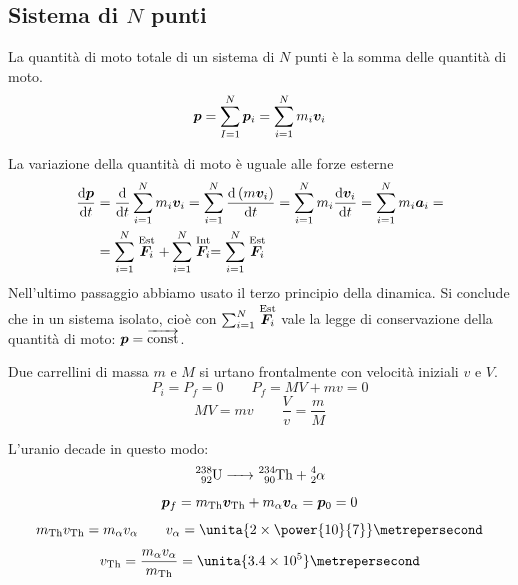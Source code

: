 \subsection{Sistema di $N$ punti}
\begin{Def}
La quantità di moto totale di un sistema di $N$ punti è la somma delle quantità di moto.
\begin{equation}
 \boldsymbol{p}=\sum_{I=1}^N\boldsymbol{p}_i=\sum_{i=1}^Nm_i\boldsymbol{v}_i
\end{equation}
\end{Def}
\begin{Teo}
 La variazione della quantità di moto è uguale alle forze esterne
\begin{align*}\frac{\mathrm{d} \boldsymbol{p}}{\mathrm{d} t}&=\frac{\mathrm{d} }{\mathrm{d} t}\sum^N_{i=1}m_i\boldsymbol{v}_i=\sum_{i=1}^{N}\frac{\mathrm{d} \left(m\boldsymbol{v}_i\right)}{\mathrm{d} t}=\sum_{i=1}^{N}m_i\frac{\mathrm{d} \boldsymbol{v}_i}{\mathrm{d} t}=\sum_{i=1}^{N}m_i\boldsymbol{a}_i=\\
&=\sum^N_{i=1}\stackrel{\text{Est}}{\boldsymbol{F}_i}+\sum^N_{i=1}\stackrel{\text{Int}}{\boldsymbol{F}_i}=\sum^N_{i=1}\stackrel{\text{Est}}{\boldsymbol{F}_i}\end{align*}
Nell'ultimo passaggio abbiamo usato il terzo principio della dinamica. Si conclude che in un sistema isolato, cioè con
$\sum^N_{i=1}\stackrel{\text{Est}}{\boldsymbol{F}_i}$ vale la legge di
conservazione della quantità di moto: $\boldsymbol{p}=\overrightarrow{\text{const}}$.
\end{Teo}
\begin{Es}[carrellini]
Due carrellini di massa $m$ e $M$ si urtano frontalmente con
velocità iniziali $v$ e $V$.
\begin{equation*} P_i= P_f=0\qquad P_f=M V+m v=0\end{equation*}
\begin{equation*}M V=m v\qquad\frac{V}{v}=\frac{m}{M}\end{equation*}
\end{Es}

\begin{Es}[decadimento]
L'uranio decade in questo modo:
\begin{equation*}\ce{^{238}_{92}U -> ^{234}_{90}Th + ^{4}_{2}\alpha}\end{equation*}
\begin{equation*}\ve p_f=m_{\ce{Th}}\ve v_{\ce{Th}}+m_\alpha \ve v_\alpha=\ve p_0=0\end{equation*}
\begin{equation*}m_{\ce{Th}}v_{\ce{Th}}=m_\alpha v_\alpha\qquad v_\alpha=\unita{2\times \power{10}{7}}\metrepersecond\end{equation*}
\begin{equation*}v_{\ce{Th}}=\frac{m_\alpha v_\alpha}{m_{\ce{Th}}}=\unita{3.4\times
10^5}\metrepersecond\end{equation*}
\end{Es}

